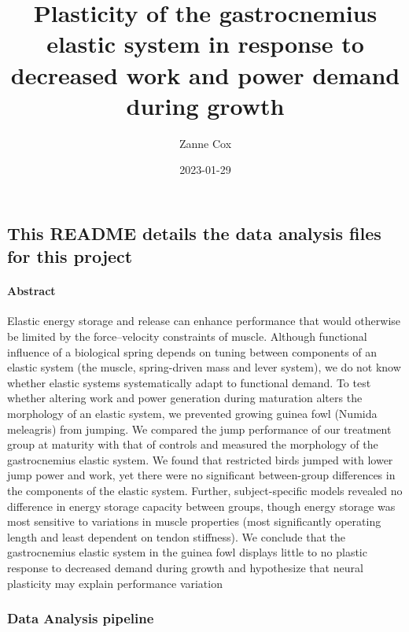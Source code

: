 \documentclass[
]{article}
\title{Plasticity of the gastrocnemius elastic system in response to
decreased work and power demand during growth}
\author{Zanne Cox}
\date{2023-01-29}
\begin{document}
\maketitle

\hypertarget{this-readme-details-the-data-analysis-files-for-this-project}{%
\subsection{This README details the data analysis files for this
project}\label{this-readme-details-the-data-analysis-files-for-this-project}}

\hypertarget{abstract}{%
\paragraph{Abstract}\label{abstract}}

Elastic energy storage and release can enhance performance that would
otherwise be limited by the force--velocity constraints of muscle.
Although functional influence of a biological spring depends on tuning
between components of an elastic system (the muscle, spring-driven mass
and lever system), we do not know whether elastic systems systematically
adapt to functional demand. To test whether altering work and power
generation during maturation alters the morphology of an elastic system,
we prevented growing guinea fowl (Numida meleagris) from jumping. We
compared the jump performance of our treatment group at maturity with
that of controls and measured the morphology of the gastrocnemius
elastic system. We found that restricted birds jumped with lower jump
power and work, yet there were no significant between-group differences
in the components of the elastic system. Further, subject-specific
models revealed no difference in energy storage capacity between groups,
though energy storage was most sensitive to variations in muscle
properties (most significantly operating length and least dependent on
tendon stiffness). We conclude that the gastrocnemius elastic system in
the guinea fowl displays little to no plastic response to decreased
demand during growth and hypothesize that neural plasticity may explain
performance variation

\hypertarget{data-analysis-pipeline}{%
\subsubsection{Data Analysis pipeline}\label{data-analysis-pipeline}}
\end{document}
